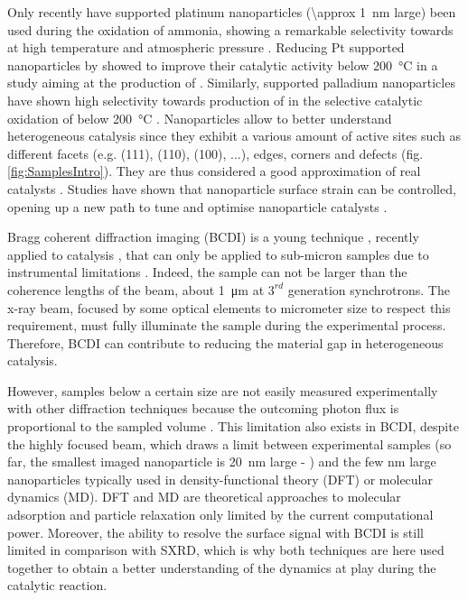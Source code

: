 Only recently have supported platinum nanoparticles (\qty{\approx 1}{\nm} large) been used during the oxidation of ammonia, showing a remarkable selectivity towards  at high temperature and atmospheric pressure \parencite{Schaffer2013}.
Reducing Pt supported nanoparticles by  showed to improve their catalytic activity below \qty{200}{\degreeCelsius} in a study aiming at the production of  \parencite{Svintsitskiy2020}.
Similarly, supported palladium nanoparticles have shown high selectivity towards production of  in the selective catalytic oxidation of  below \qty{200}{\degreeCelsius} \parencite{Dann2019}.
Nanoparticles allow to better understand heterogeneous catalysis since they exhibit a various amount of active sites such as different facets (e.g. (111), (110), (100), ...), edges, corners and defects (fig. \ref{fig:SamplesIntro}).
They are thus considered a good approximation of real catalysts \parencite{Somorjai2007, Molenbroek2009, Cuenya2010, Kwangjin2012, Schauermann2013}.
Studies have shown that nanoparticle surface strain can be controlled, opening up a new path to tune and optimise nanoparticle catalysts \parencite{Zhang2014, Sneed2015, Wang2016}.

Bragg coherent diffraction imaging (BCDI) is a young technique \parencite{Robinson2001}, recently applied to catalysis \parencite{Ulvestad2016}, that can only be applied to sub-micron samples due to instrumental limitations \parencite{Marchesini2003a}.
Indeed, the sample can not be larger than the coherence lengths of the beam, about \qty{1}{\um} at $3^{rd}$ generation synchrotrons.
The x-ray beam, focused by some optical elements to micrometer size to respect this requirement, must fully illuminate the sample during the experimental process.
Therefore, BCDI can contribute to reducing the material gap in heterogeneous catalysis.

However, samples below a certain size are not easily measured experimentally with other diffraction techniques because the outcoming photon flux is proportional to the sampled volume \parencite{Willmott}.
This limitation also exists in BCDI, despite the highly focused beam, which draws a limit between experimental samples (so far, the smallest imaged nanoparticle is \qty{20}{\nm} large - \cite{Bjorling2019, Carnis2021}) and the few \unit{\nm} large nanoparticles typically used in density-functional theory (DFT) or molecular dynamics (MD).
DFT and MD are theoretical approaches to molecular adsorption and particle relaxation only limited by the current computational power.
Moreover, the ability to resolve the surface signal with BCDI is still limited in comparison with SXRD, which is why both techniques are here used together to obtain a better understanding of the dynamics at play during the catalytic reaction.

